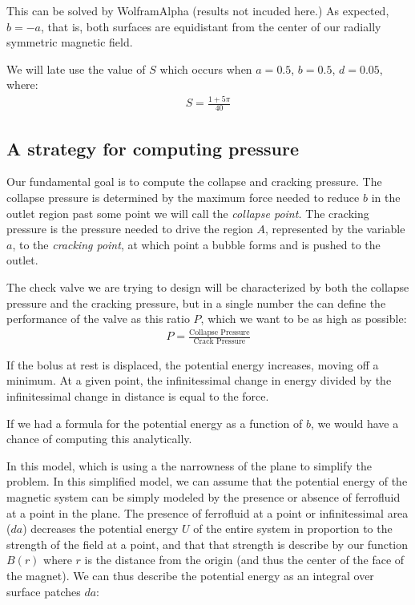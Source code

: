 \documentclass[]{asme2ej}
\begin{document}
This can be solved by WolframAlpha (results not incuded here.)
As expected, $ b = -a $, that is, both surfaces are equidistant from the
center of our radially symmetric magnetic field.

We will late use the value of $S$ which occurs when $a = 0.5$, $b = 0.5$, $d = 0.05$, where:
\begin{align}
  S = \frac{1 + 5 \pi}{40}
\end{align}

\subsection{A strategy for computing pressure}

Our fundamental goal is to compute the collapse and cracking
pressure. The collapse pressure is determined by the maximum force needed
to reduce $b$ in the outlet region past some point we will call the
{\em collapse point.}
The cracking pressure is the pressure needed to drive the region $A$, represented
by the variable $a$, to the {\em cracking point}, at which point
a bubble forms and is pushed to the outlet.

The check valve we are trying to design will be characterized by
both the collapse pressure and the cracking pressure, but in a single
number the can define the performance of the valve as this ratio $P$,
which we want to be as high as possible:
\begin{align}
  P = \frac{\text{Collapse Pressure}}{\text{Crack Pressure}}
  \end{align}

If the bolus at rest is displaced, the potential energy increases,
moving off a minimum. At a given point, the infinitessimal change
in energy divided by the infinitessimal change in distance
is equal to the force.

If we had a formula for the potential energy as a function of $b$,
we would have a chance of computing this analytically.

In this model, which is using a the narrowness of the plane to simplify
the problem. In this simplified model, we can assume
that the potential energy of the magnetic system can be simply
modeled by the presence or absence of ferrofluid at a point in the plane.
The presence of ferrofluid at a point or infinitessimal area ($da$) decreases the potential energy $U$
of the entire system in proportion to the strength of the field at a point,
and that that strength is describe by our function $B(r)$ where $r$ is the
distance from the origin (and thus the center of the face of the magnet).
We can thus describe the potential energy as an integral over surface patches $da$:
\end{document}
